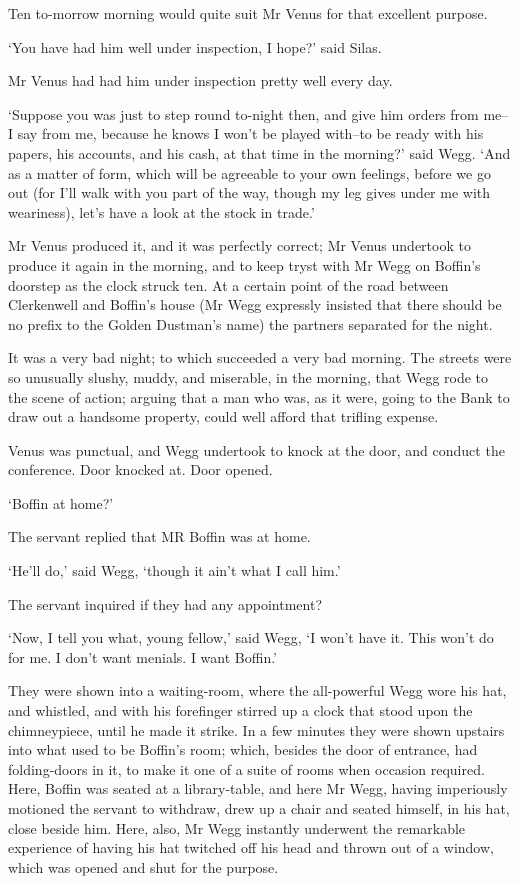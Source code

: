 Ten to-morrow morning would quite suit Mr Venus for that excellent
purpose.

‘You have had him well under inspection, I hope?’ said Silas.

Mr Venus had had him under inspection pretty well every day.

‘Suppose you was just to step round to-night then, and give him orders
from me--I say from me, because he knows I won’t be played with--to be
ready with his papers, his accounts, and his cash, at that time in the
morning?’ said Wegg. ‘And as a matter of form, which will be agreeable
to your own feelings, before we go out (for I’ll walk with you part of
the way, though my leg gives under me with weariness), let’s have a look
at the stock in trade.’

Mr Venus produced it, and it was perfectly correct; Mr Venus undertook
to produce it again in the morning, and to keep tryst with Mr Wegg on
Boffin’s doorstep as the clock struck ten. At a certain point of the
road between Clerkenwell and Boffin’s house (Mr Wegg expressly insisted
that there should be no prefix to the Golden Dustman’s name) the
partners separated for the night.

It was a very bad night; to which succeeded a very bad morning. The
streets were so unusually slushy, muddy, and miserable, in the morning,
that Wegg rode to the scene of action; arguing that a man who was, as
it were, going to the Bank to draw out a handsome property, could well
afford that trifling expense.

Venus was punctual, and Wegg undertook to knock at the door, and conduct
the conference. Door knocked at. Door opened.

‘Boffin at home?’

The servant replied that MR Boffin was at home.

‘He’ll do,’ said Wegg, ‘though it ain’t what I call him.’

The servant inquired if they had any appointment?

‘Now, I tell you what, young fellow,’ said Wegg, ‘I won’t have it. This
won’t do for me. I don’t want menials. I want Boffin.’

They were shown into a waiting-room, where the all-powerful Wegg wore
his hat, and whistled, and with his forefinger stirred up a clock that
stood upon the chimneypiece, until he made it strike. In a few minutes
they were shown upstairs into what used to be Boffin’s room; which,
besides the door of entrance, had folding-doors in it, to make it one
of a suite of rooms when occasion required. Here, Boffin was seated at a
library-table, and here Mr Wegg, having imperiously motioned the servant
to withdraw, drew up a chair and seated himself, in his hat, close
beside him. Here, also, Mr Wegg instantly underwent the remarkable
experience of having his hat twitched off his head and thrown out of a
window, which was opened and shut for the purpose.

